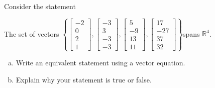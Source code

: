 
\begin{exerciseStatement}


Consider the statement 
\begin{center}\begin{minipage}{0.8\textwidth}
 The set of vectors \( \left\{ \left[\begin{array}{c}
-2 \\
0 \\
2 \\
1
\end{array}\right] , \left[\begin{array}{c}
-3 \\
3 \\
-3 \\
-3
\end{array}\right] , \left[\begin{array}{c}
5 \\
-9 \\
13 \\
11
\end{array}\right] , \left[\begin{array}{c}
17 \\
-27 \\
37 \\
32
\end{array}\right] \right\} \)spans \(\mathbb{R}^4\). 
\end{minipage}\end{center}
    


\begin{enumerate}[(a)]
\item  Write an equivalent statement using a vector equation.
\item  Explain why your statement is true or false.
\end{enumerate}
    
\end{exerciseStatement}
    
